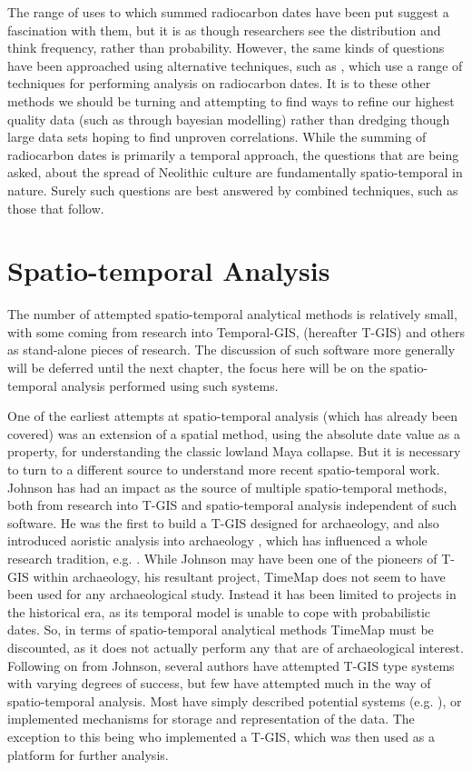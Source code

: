 The range of uses to which summed radiocarbon dates have been put suggest a fascination with them, but it is as though researchers see the distribution and think frequency, rather than probability. However, the same kinds of questions have been approached using alternative techniques, such as \citet{Steele20102017,BocquetAppel2009807}, which use a range of techniques for performing analysis on radiocarbon dates. It is to these other methods we should be turning and attempting to find ways to refine our highest quality data (such as through bayesian modelling) rather than dredging though large data sets hoping to find unproven correlations. While the summing of radiocarbon dates is primarily a temporal approach, the questions that are being asked, about the spread of Neolithic culture are fundamentally spatio-temporal in nature. Surely such questions are best answered by combined techniques, such as those that follow.

\section{Spatio-temporal Analysis} \label{sec:sta}
The number of attempted spatio-temporal analytical methods is relatively small, with some coming from research into Temporal-GIS, (hereafter T-GIS) and others as stand-alone pieces of research. The discussion of such software more generally will be deferred until the next chapter, the focus here will be on the spatio-temporal analysis performed using such systems.

One of the earliest attempts at spatio-temporal analysis (which has already been covered) was an extension of a spatial method, using the absolute date value as a property, for understanding the classic lowland Maya collapse. But it is necessary to turn to a different source to understand more recent spatio-temporal work. Johnson has had an impact as the source of multiple spatio-temporal methods, both from research into T-GIS and spatio-temporal analysis independent of such software. He was the first to build a T-GIS designed for archaeology, \citep{Johnson:1999cr, Johnson:2002kx} and also introduced aoristic analysis into archaeology \citep{Johnson:2004fk}, which has influenced a whole research tradition, e.g. \citet{Crema20101118}. 
While Johnson may have been one of the pioneers of T-GIS within archaeology, his resultant project, TimeMap does not seem to have been used for any archaeological study. Instead it has been limited to projects in the historical era, as its temporal model is unable to cope with probabilistic dates. So, in terms of spatio-temporal analytical methods TimeMap must be discounted, as it does not actually perform any that are of archaeological interest. Following on from Johnson, several authors have attempted T-GIS type systems with varying degrees of success, but few have attempted much in the way of spatio-temporal analysis. Most have simply described potential systems (e.g. \citealp{lock2002analysing}), or implemented mechanisms for storage and representation of the data. The exception to this being \citet{Green:2008fk} who implemented a T-GIS, which was then used as a platform for further analysis.

